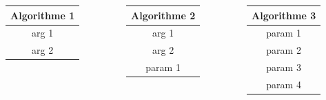 \documentclass[11pt]{beamer}
\begin{document}
\begin{frame}
	\begin{columns}
		\begin{column}{3cm}
			\begin{table}[h]
				\begin{center}
					\begin{tabular}{|c|}
						\hline
						\textbf{Algorithme 1} \\
						\hline
						arg 1 \\
						arg 2 \\
						\hline
					\end{tabular}
				\end{center}
			\end{table}
		\end{column}
		\begin{column}{3cm}
			\begin{table}[h]
				\begin{center}
					\begin{tabular}{|c|}
						\hline
						\textbf{Algorithme 2} \\
						\hline
						arg 1 \\
						arg 2 \\
						param 1 \\
						\hline
					\end{tabular}
				\end{center}
			\end{table}
		\end{column}
	\begin{column}{3cm}
	\begin{table}[h]
		\begin{center}
			\begin{tabular}{|c|}
				\hline
				\textbf{Algorithme 3} \\
				\hline
				param 1 \\
				param 2 \\
				param 3 \\
				param 4 \\
				\hline
			\end{tabular}
		\end{center}
	\end{table}
	\end{column}
	\end{columns}
\end{frame}
\end{document}
